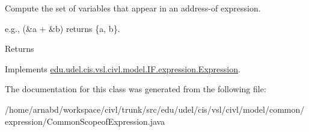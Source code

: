 Compute the set of variables that appear in an address-\/of expression. 

e.\+g., {\ttfamily (\&a + \&b)} returns {\ttfamily \{a, b\}}.

\begin{DoxyReturn}{Returns}

\end{DoxyReturn}


Implements \hyperlink{interfaceedu_1_1udel_1_1cis_1_1vsl_1_1civl_1_1model_1_1IF_1_1expression_1_1Expression_ac2ad0236534bec54b91ee78ff658cbe0}{edu.\+udel.\+cis.\+vsl.\+civl.\+model.\+I\+F.\+expression.\+Expression}.



The documentation for this class was generated from the following file\+:\begin{DoxyCompactItemize}
\item 
/home/arnabd/workspace/civl/trunk/src/edu/udel/cis/vsl/civl/model/common/expression/Common\+Scopeof\+Expression.\+java\end{DoxyCompactItemize}
